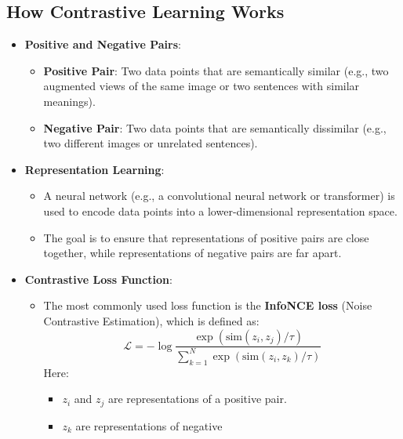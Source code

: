 \begin{notechapter}
\section{How Contrastive Learning Works}
\begin{itemize}
    \item \textbf{Positive and Negative Pairs}:
          \begin{itemize}
              \item \textbf{Positive Pair}: Two data points that are 
                    semantically similar (e.g., two augmented views of 
                    the same image or two sentences with similar 
                    meanings).
              \item \textbf{Negative Pair}: Two data points that are 
                    semantically dissimilar (e.g., two different images 
                    or unrelated sentences).
          \end{itemize}
    \item \textbf{Representation Learning}:
          \begin{itemize}
              \item A neural network (e.g., a convolutional neural 
                    network or transformer) is used to encode data 
                    points into a lower-dimensional representation 
                    space.
              \item The goal is to ensure that representations of 
                    positive pairs are close together, while 
                    representations of negative pairs are far apart.
          \end{itemize}
    \item \textbf{Contrastive Loss Function}:
          \begin{itemize}
              \item The most commonly used loss function is the 
                    \textbf{InfoNCE loss} (Noise Contrastive 
                    Estimation), which is defined as:
                    \[
                    \mathcal{L} = -\log \frac{\exp(\text{sim}(z_i, z_j) 
                    / \tau)}{\sum_{k=1}^N \exp(\text{sim}(z_i, z_k) / 
                    \tau)}
                    \]
                    Here:
                    \begin{itemize}
                        \item \(z_i\) and \(z_j\) are representations 
                              of a positive pair.
                        \item \(z_k\) are representations of negative 

\end{itemize}
\end{itemize}
\end{itemize}
\end{notechapter}
